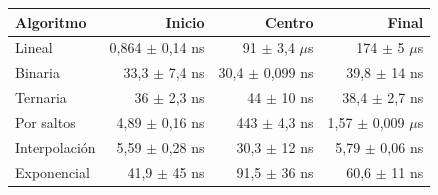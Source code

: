 {\small
\begin{tabular}{lrrr}
\toprule
Algoritmo & Inicio & Centro & Final \\
\midrule
Lineal & 0,864 $\pm$ 0,14 ns & 91 $\pm$ 3,4 $\mu$s & 174 $\pm$ 5 $\mu$s \\
Binaria & 33,3 $\pm$ 7,4 ns & 30,4 $\pm$ 0,099 ns & 39,8 $\pm$ 14 ns \\
Ternaria & 36 $\pm$ 2,3 ns & 44 $\pm$ 10 ns & 38,4 $\pm$ 2,7 ns \\
Por saltos & 4,89 $\pm$ 0,16 ns & 443 $\pm$ 4,3 ns & 1,57 $\pm$ 0,009 $\mu$s \\
Interpolaci\'on & 5,59 $\pm$ 0,28 ns & 30,3 $\pm$ 12 ns & 5,79 $\pm$ 0,06 ns \\
Exponencial & 41,9 $\pm$ 45 ns & 91,5 $\pm$ 36 ns & 60,6 $\pm$ 11 ns \\
\bottomrule
\end{tabular}}\par
